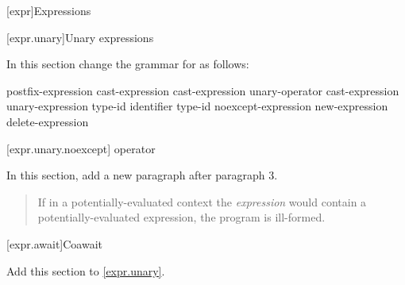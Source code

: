 

\setcounter{chapter}{4}
[expr]{Expressions}

\setcounter{section}{2}
[expr.unary]{Unary expressions}


In this section change the grammar for  as follows:

\begin{bnf}
	\br
	postfix-expression\br
	\terminal{++} cast-expression\br
	\terminal{-{-}} cast-expression\br
	\br
	unary-operator cast-expression\br
	 unary-expression\br
	 type-id \terminal{)}\br
	 \terminal{(} identifier \terminal{)}\br
	 type-id \terminal{)}\br
	noexcept-expression\br
	new-expression\br
	delete-expression\br
\end{bnf}

\setcounter{subsection}{6}
[expr.unary.noexcept]{ operator}


In this section, add a new paragraph after paragraph 3.

\begin{quote}
\setcounter{Paras}{3}
\pnum
If in a potentially-evaluated context the \textit{expression} would contain a potentially-evaluated  expression, the program is ill-formed.
\end{quote}

\setcounter{subsection}{7}
[expr.await]{Coawait}

Add this section to \ref{expr.unary}.

